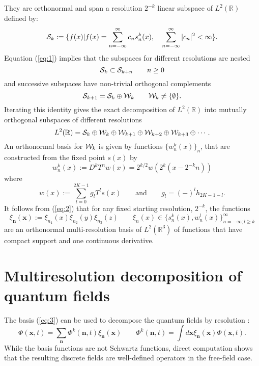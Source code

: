 \documentclass[aps,prc,reprint,showpacs,groupedaddress,onecolumn]{revtex4}
\def\beq{\begin{equation}}
\def\eeq{\end{equation}}
\begin{document}
They are orthonormal and span a 
resolution $2^{-k}$ linear subspace of 
$L^2(\mathbb{R})$ defined by:
\[
{\cal S}_k := \{ f(x) \vert f(x)= \sum_{n=-\infty}^\infty c_n s^k_n(x),
\quad \sum_{n=-\infty}^\infty \vert c_n \vert^2 < \infty \}.
\]
Equation (\ref{eq:1}) implies that 
the subspaces for different resolutions are nested
\[
{\cal S}_{k} \subset {\cal S}_{k+n} \qquad n\geq 0 
\]
and successive subspaces have non-trivial orthogonal complements
\[
{\cal S}_{k+1} = {\cal S}_{k} \oplus {\cal W}_{k} \qquad {\cal W}_k \not= \{\emptyset \}.  
\]
Iterating this identity gives the exact decomposition of $L^2(\mathbb{R})$ 
into mutually orthogonal subspaces of different resolutions 
\beq
L^2 (\mathbb{R}) = {\cal S}_{k}\oplus {\cal W}_{k} \oplus {\cal W}_{k+1}
\oplus {\cal W}_{k+2} \oplus {\cal W}_{k+3} \oplus  \cdots  .
\label{eq:2}
\eeq
%
%
% 
%
%
An orthonormal basis for ${\cal W}_{k}$ is given by  
functions $\{ w^k_n (x)\}_n$,  
that are constructed from 
the fixed point $s(x)$ by 
\[
w^k_n (x) := D^k T^n w(x) = 2^{k/2} w\left (2^k(x-2^{-k}n)\right ) 
\]
where 
\[
w(x) :=\sum_{l=0}^{2K-1} g_l T^l s(x)
\qquad \mbox{and} \qquad g_l = (-)^l h_{2K-1-l}.
\]
It follows from (\ref{eq:2}) that for any fixed starting resolution, 
$2^{-k}$, the functions 
\beq
\xi_{\mathbf{n}}(\mathbf{x}):= \xi_{n_1}(x)\xi_{n_2}(y) \xi_{n_3}(z)
\qquad
\xi_n(x) \in \{ s_n^k(x), w^l_n(x) \}_{n=-\infty;l\geq k}^{\infty} 
\label{eq:3}
\eeq
are an orthonormal multi-resolution basis of $L^2(\mathbb{R}^3)$ of 
functions that have compact support and one continuous derivative.

\section{Multiresolution decomposition of quantum fields}
\label{sec:2}

The basis (\ref{eq:3}) can be used to decompose the 
quantum fields by resolution \cite{fatih}\cite{tracie}:
\beq
\Phi (\mathbf{x},t) =
\sum_{\mathbf{n}} \Phi^k (\mathbf{n},t) \xi_{\mathbf{n}}(\mathbf{x})   
\qquad
\Phi^k (\mathbf{n},t) = \int d\mathbf{x}\xi_{\mathbf{n}}(\mathbf{x}) 
\Phi (\mathbf{x},t) .
\label{eq:4}
\eeq
While the basis functions are not Schwartz functions, direct computation 
shows that the resulting discrete fields are well-defined operators in the 
free-field case.  
\end{document}
